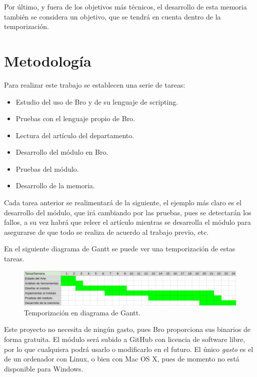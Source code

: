 \intro Por último, y fuera de los objetivos más técnicos, el desarrollo de esta memoria también se 
considera un objetivo, que se tendrá en cuenta dentro de la temporización.

\section{Metodología}

Para realizar este trabajo se establecen una serie de tareas:

\begin{itemize}
\item Estudio del uso de Bro y de su lenguaje de scripting.
\item Pruebas con el lenguaje propio de Bro.
\item Lectura del artículo del departamento. \cite{comparacion}
\item Desarrollo del módulo en Bro.
\item Pruebas del módulo.
\item Desarrollo de la memoria.
\end{itemize}

Cada tarea anterior se realimentará de la siguiente, el ejemplo más claro es el desarrollo del módulo, que 
irá cambiando por las pruebas, pues se detectarán los fallos, a su vez habrá que releer el artículo mientras 
se desarrolla el módulo para asegurarse de que todo se realiza de acuerdo al trabajo previo, etc.

\intro En el siguiente diagrama de Gantt se puede ver una temporización de estas tareas. 

\begin{figure}[H]
  \includegraphics[width=1\textwidth]{imagenes/temporizacion.png} 
  \centering
  \caption{Temporización en diagrama de Gantt.}
\end{figure}

Este proyecto no necesita de ningún gasto, pues Bro \cite{broindex} proporciona sus binarios de 
forma gratuita. El módulo será subido a GitHub \cite{repo} con licencia de software libre, por lo que cualquiera 
podrá usarlo o modificarlo en el futuro. El único \textit{gasto} es el de un ordenador con Linux, 
o bien con Mac OS X, pues de momento no está disponible para Windows. \cite{brodownload}

